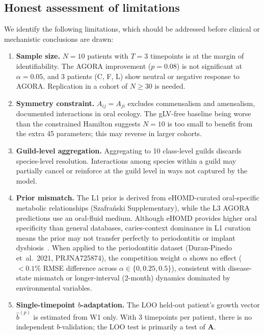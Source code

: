\documentclass[11pt,a4paper]{article}
\newcommand{\bA}{\mathbf{A}}
\begin{document}
\subsection{Honest assessment of limitations}
\label{ssec:limitations}

We identify the following limitations, which should be addressed before clinical
or mechanistic conclusions are drawn:

\begin{enumerate}
  \item \textbf{Sample size.} $N=10$ patients with $T=3$ timepoints is at the margin
        of identifiability. The AGORA improvement ($p=0.08$) is not significant at
        $\alpha=0.05$, and 3 patients (C, F, L) show neutral or negative response to AGORA.
        Replication in a cohort of $N\geq 30$ is needed.

  \item \textbf{Symmetry constraint.} $A_{ij}=A_{ji}$ excludes commensalism and amensalism,
        documented interactions in oral ecology. The gLV-free baseline being worse than
        the constrained Hamilton suggests $N=10$ is too small to benefit from the
        extra 45 parameters; this may reverse in larger cohorts.

  \item \textbf{Guild-level aggregation.} Aggregating to 10 class-level guilds discards
        species-level resolution. Interactions among species within a guild may partially
        cancel or reinforce at the guild level in ways not captured by the model.

  \item \textbf{Prior mismatch.} The L1 prior is derived from eHOMD-curated
        oral-specific metabolic relationships (Szafra\'{n}ski Supplementary), while the
        L3 AGORA predictions use an oral-fluid medium. Although eHOMD provides higher
        oral specificity than general databases, caries-context dominance in L1 curation
        means the prior may not transfer perfectly to periodontitis or implant
        dysbiosis~\citep{joshi2025}. When applied to the periodontitis dataset
        (Duran-Pinedo et~al.~2021, PRJNA725874), the competition weight $\alpha$ shows
        no effect ($<0.1\%$ RMSE difference across $\alpha\in\{0,0.25,0.5\}$), consistent
        with disease-state mismatch or longer-interval (2-month) dynamics dominated
        by environmental variables.

  \item \textbf{Single-timepoint $b$-adaptation.} The LOO held-out patient's growth
        vector $\hat{b}^{(p)}$ is estimated from W1 only. With 3 timepoints per patient,
        there is no independent $b$-validation; the LOO test is primarily a test of $\bA$.


\end{enumerate}
\end{document}
